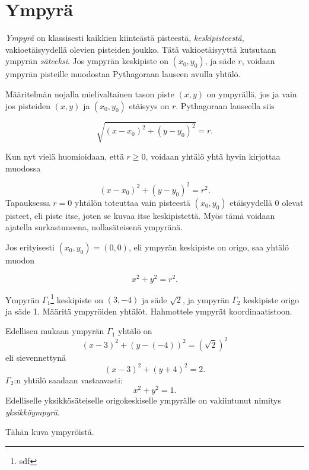 \section{Ympyrä}


\emph{Ympyrä} on klassisesti kaikkien kiinteästä pisteestä, \emph{keskipisteestä}, vakioetäisyydellä olevien pisteiden joukko. Tätä vakioetäisyyttä kutsutaan ympyrän \emph{säteeksi}. Jos ympyrän keskipiste on $(x_{0},y_{0})$, ja säde $r$, voidaan ympyrän pisteille muodostaa Pythagoraan lauseen avulla yhtälö.

Määritelmän nojalla mielivaltainen tason piste $(x,y)$ on ympyrällä, jos ja vain jos pisteiden $(x,y)$ ja $(x_{0},y_{0})$ etäisyys on $r$. Pythagoraan lauseella siis

\[
\sqrt{(x-x_{0})^{2}+(y-y_{0})^{2}} = r.
\]

Kun nyt vielä huomioidaan, että $r \geq 0$, voidaan yhtälö yhtä hyvin kirjottaa muodossa

\[
(x-x_{0})^{2}+(y-y_{0})^{2} = r^{2}.
\]
Tapauksessa $r=0$ yhtälön toteuttaa vain pisteestä $(x_{0},y_{0})$ etäisyydellä 0 olevat pisteet, eli piste itse, joten se kuvaa itse keskipistettä. Myös tämä voidaan ajatella surkastuneena, nollasäteisenä ympyränä.

Jos erityisesti $(x_{0},y_{0})= (0,0)$, eli ympyrän keskipiste on origo, saa yhtälö muodon

\[
x^{2}+y^{2} = r^{2}.
\]


\begin{esimerkki}
Ympyrän $\Gamma_{1}$\footnote{sdf} keskipiste on $(3,-4)$ ja säde $\sqrt{2}$, ja ympyrän $\Gamma_{2}$ keskipiste origo ja säde 1. Määritä ympyröiden yhtälöt. Hahmottele ympyrät koordinaatistoon.

\begin{esimratk}
Edellisen mukaan ympyrän $\Gamma_{1}$ yhtälö on
\[
(x-3)^{2}+(y-(-4))^{2} = (\sqrt{2})^{2}
\]
eli sievennettynä
\[
(x-3)^{2}+(y+4)^{2} = 2.
\]
$\Gamma_{2}$:n yhtälö saadaan vastaavasti:
\[
x^{2}+y^{2} = 1.
\]
Edelliselle yksikkösäteiselle origokeskiselle ympyrälle on vakiintunut nimitys \emph{yksikköympyrä}.

Tähän kuva ympyröistä.

\end{esimratk}
\end{esimerkki}

